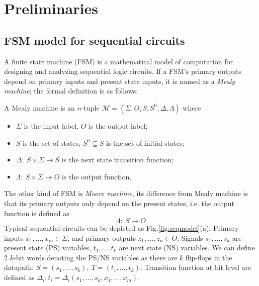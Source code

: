 %


\section{Preliminaries}

\subsection{FSM model for sequential circuits}
A finite state machine (FSM) is a mathematical model of computation for designing and analyzing sequential logic 
circuits. If a FSM's primary outputs depend on primary inputs and present state inputs, it is named as a \textit{Mealy machine};
the formal definition is as follows:
\begin{definition}
A Mealy machine is an $n$-tuple $\mathcal M = (\Sigma,O,S,S^0,\Delta,\Lambda)$ where
\begin{itemize}
\item $\Sigma$ is the input label, $O$ is the output label;
\item $S$ is the set of states, $S^0\subseteq S$ is the set of initial states;
\item $\Delta:\ S\times\Sigma\to S$ is the next state transition function;
\item $\Lambda:\ S\times\Sigma\to O$ is the output function.
\end{itemize}
\end{definition}
The other kind of FSM is \textit{Moore machine}, its difference from Mealy machine is that
its primary outputs only depend on the present states, i.e. the output function is defined as
$$\Lambda:\ S \to O$$
Typical sequential circuits can be depicted as Fig.\ref{fig:seqmodel}(a). Primary inputs
$x_1,\dots,x_m \in \Sigma$, and primary outputs $z_1,\dots,z_n\in O$. Signals $s_1,\dots,s_k$ 
are present state (PS) variables, $t_1,\dots,t_k$ are next state (NS) variables.
We can define 2 $k$-bit words denoting the PS/NS variables as there are $k$ flip-flops
in the datapath: $S = (s_1,\dots,s_k), ~T=(t_1,\dots,t_k)$. Transition function
at bit level are defined as $\Delta_i: t_i = \Delta_i(s_1,\dots,s_k,x_1,\dots,x_m)$.
\begin{figure}[hbt]
\end{figure}
